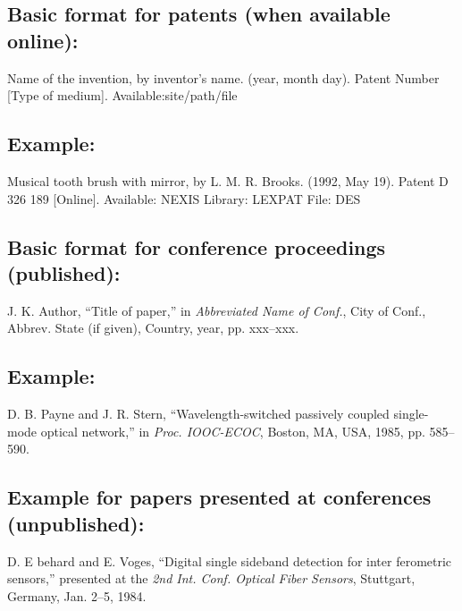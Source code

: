 \documentclass[journal]{IEEEtran}
\begin{document}
\subsection*{Basic format for patents (when available online):}

Name of the invention, by inventor’s name. (year, month day). Patent Number [Type of medium]. Available:site/path/file

\subsection*{Example:}

\begin{thebibliography}{34}
\setcounter{enumiv}{20}

\bibitem{}Musical tooth brush with mirror, by L. M. R. Brooks. (1992, May 19). Patent D 326 189
[Online]. Available: NEXIS Library: LEXPAT File:   DES 

\end{thebibliography}

\subsection*{Basic format for conference proceedings (published):}

J. K. Author, ``Title of paper,'' in {\em Abbreviated Name of Conf.}, City of Conf., Abbrev. State (if given), Country, year, pp. xxx--xxx.

\subsection*{Example:}

\begin{thebibliography}{34}
\setcounter{enumiv}{21}

\bibitem{}D. B. Payne and J. R. Stern, ``Wavelength-switched passively coupled single-mode optical network,'' in {\em Proc. IOOC-ECOC}, Boston, MA, USA, 1985,
pp. 585--590.

\end{thebibliography}

\subsection*{Example for papers presented at conferences (unpublished):}

\begin{thebibliography}{34}
\setcounter{enumiv}{22}

\bibitem{}D. E behard and E. Voges, ``Digital single sideband detection for inter ferometric sensors,'' presented at the {\em 2nd Int. Conf. Optical Fiber Sensors}, Stuttgart, Germany, Jan. 2--5, 1984.
\end{thebibliography}
\end{document}
